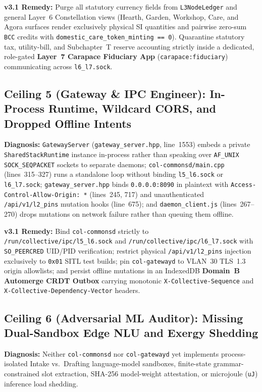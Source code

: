 \textbf{v3.1 Remedy:} Purge all statutory currency fields from \texttt{L3NodeLedger} and general Layer~6 Constellation views (Hearth, Garden, Workshop, Care, and Agora surfaces render exclusively physical SI quantities and pairwise zero-sum \texttt{BCC} credits with \texttt{domestic\_care\_token\_minting == 0}). Quarantine statutory tax, utility-bill, and Subchapter~T reserve accounting strictly inside a dedicated, role-gated \textbf{Layer~7 Carapace Fiduciary App} (\texttt{carapace:fiduciary}) communicating across \texttt{l6\_l7.sock}.

\subsection{Ceiling 5 (Gateway \& IPC Engineer): In-Process Runtime, Wildcard CORS, and Dropped Offline Intents}
\textbf{Diagnosis:} \texttt{GatewayServer} (\texttt{gateway\_server.hpp}, line~1553) embeds a private \texttt{SharedStackRuntime} instance in-process rather than speaking over \texttt{AF\_UNIX} \texttt{SOCK\_SEQPACKET} sockets to separate daemons; \texttt{col-commonsd/main.cpp} (lines~315--327) runs a standalone loop without binding \texttt{l5\_l6.sock} or \texttt{l6\_l7.sock}; \texttt{gateway\_server.hpp} binds \texttt{0.0.0.0:8090} in plaintext with \texttt{Access-Control-Allow-Origin: *} (lines~245, 717) and unauthenticated \texttt{/api/v1/l2\_pins} mutation hooks (line~675); and \texttt{daemon\_client.js} (lines~267--270) drops mutations on network failure rather than queuing them offline.

\textbf{v3.1 Remedy:} Bind \texttt{col-commonsd} strictly to \texttt{/run/collective/ipc/l5\_l6.sock} and \texttt{/run/collective/ipc/l6\_l7.sock} with \texttt{SO\_PEERCRED} UID/PID verification; restrict physical \texttt{/api/v1/l2\_pins} injection exclusively to \texttt{0x01} SITL test builds; pin \texttt{col-gatewayd} to VLAN~30 TLS~1.3 origin allowlists; and persist offline mutations in an IndexedDB \textbf{Domain~B Automerge CRDT Outbox} carrying monotonic \texttt{X-Collective-Sequence} and \texttt{X-Collective-Dependency-Vector} headers.

\subsection{Ceiling 6 (Adversarial ML Auditor): Missing Dual-Sandbox Edge NLU and Exergy Shedding}
\textbf{Diagnosis:} Neither \texttt{col-commonsd} nor \texttt{col-gatewayd} yet implements process-isolated Intake vs.\ Drafting language-model sandboxes, finite-state grammar-constrained slot extraction, SHA-256 model-weight attestation, or microjoule (\texttt{uJ}) inference load shedding.


